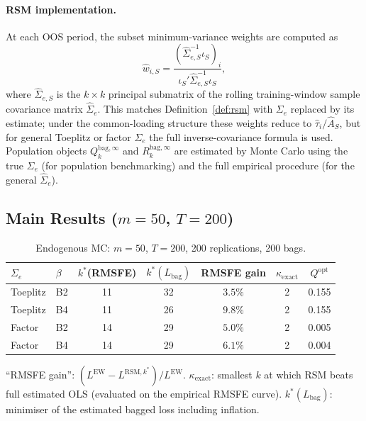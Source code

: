 \documentclass[12pt,a4paper]{article}
\theoremstyle{definition}
\begin{document}
\paragraph{RSM implementation.}
At each OOS period, the subset minimum-variance weights are computed as
\begin{equation}
\hat w_{i,S} = \frac{(\hat\Sigma_{e,S}^{-1}\iota_S)_i}{\iota_S'\hat\Sigma_{e,S}^{-1}\iota_S},
\end{equation}
where $\hat\Sigma_{e,S}$ is the $k\times k$ principal submatrix of the
rolling training-window sample covariance matrix $\hat\Sigma_e$. This matches
Definition~\ref{def:rsm} with $\Sigma_e$ replaced by its estimate; under
the common-loading structure these weights reduce to $\hat\tau_i/\hat A_S$,
but for general Toeplitz or factor $\Sigma_e$ the full inverse-covariance
formula is used. Population objects
$Q_k^{\mathrm{bag},\infty}$ and $R_k^{\mathrm{bag},\infty}$ are estimated
by Monte Carlo using the true $\Sigma_e$ (for population benchmarking)
and the full empirical procedure (for the general $\hat\Sigma_e$).

\subsection{Main Results ($m=50$, $T=200$)}

\begin{table}[ht]
\centering
\caption{Endogenous MC: $m=50$, $T=200$, 200 replications, 200 bags.}
\label{tab:endo_main}
\begin{tabular}{llccccc}
\toprule
$\Sigma_e$ & $\beta$ & $k^*$(RMSFE) & $k^*(L_{\mathrm{bag}})$
           & RMSFE gain & $\kappa_{\mathrm{exact}}$ & $Q^{\mathrm{opt}}$ \\
\midrule
Toeplitz & B2 & 11 & 32 & $3.5\%$ & 2 & 0.155 \\
Toeplitz & B4 & 11 & 26 & $9.8\%$ & 2 & 0.155 \\
Factor   & B2 & 14 & 29 & $5.0\%$ & 2 & 0.005 \\
Factor   & B4 & 14 & 29 & $6.1\%$ & 2 & 0.004 \\
\bottomrule
\end{tabular}

\medskip
\footnotesize{``RMSFE gain'': $(L^{\mathrm{EW}}-L^{\mathrm{RSM},k^*})/L^{\mathrm{EW}}$.
$\kappa_{\mathrm{exact}}$: smallest $k$ at which RSM beats full estimated OLS
(evaluated on the empirical RMSFE curve). $k^*(L_{\mathrm{bag}})$: minimiser of the
estimated bagged loss including inflation.}
\end{table}
\end{document}

